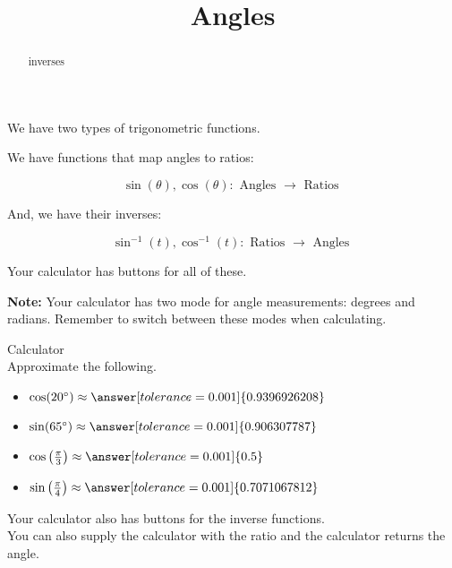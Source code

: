 \documentclass{ximera}
\title{Angles}
\begin{document}
\begin{abstract}
inverses
\end{abstract}
\maketitle




We have two types of trigonometric functions.


We have functions that map angles to ratios:


\[
\sin(\theta), \cos(\theta) :  \text{ Angles } \to \text{ Ratios }
\]


And, we have their inverses:



\[
\sin^{-1}(t), \cos^{-1}(t) :  \text{ Ratios } \to \text{ Angles }
\]








Your calculator has buttons for all of these.


\textbf{Note:}  Your calculator has two mode for angle measurements: degrees and radians.  Remember to switch between these modes when calculating.



\begin{question} Calculator \\

Approximate the following.

\begin{itemize}
\item $\cos(20^{\circ}) \approx \answer[tolerance=0.001]{0.9396926208}$
\item $\sin(65^{\circ}) \approx \answer[tolerance=0.001]{0.906307787}$
\item $\cos\left( \frac{\pi}{3} \right) \approx \answer[tolerance=0.001]{0.5}$
\item $\sin\left( \frac{\pi}{4} \right) \approx \answer[tolerance=0.001]{0.7071067812}$
\end{itemize}

\end{question}





Your calculator also has buttons for the inverse functions. \\




You can also supply the calculator with the ratio and the calculator returns the angle.
\end{document}
